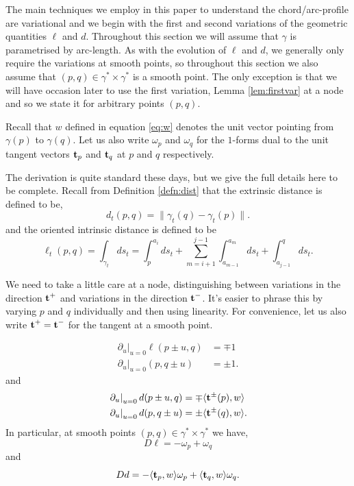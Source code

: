 \documentclass[11pt]{amsart}
\begin{document}
The main techniques we employ in this paper to understand the chord/arc-profile are variational and we begin with the first and second variations of the geometric quantities \(\ell\) and \(d\). Throughout this section we will assume that \(\gamma\) is parametrised by arc-length. As with the evolution of \(\ell\) and \(d\), we generally only require the variations at smooth points, so throughout this section we also assume that \((p,q) \in \gamma^{\ast} \times \gamma^{\ast}\) is a smooth point. The only exception is that we will have occasion later to use the first variation, Lemma \ref{lem:firstvar} at a node and so we state it for arbitrary points \((p,q)\).

Recall that \(w\) defined in equation \eqref{eq:w} denotes the unit vector pointing from \(\gamma(p)\) to \(\gamma(q)\). Let us also write $\omega_p$ and $\omega_q$ for the $1$-forms dual to the unit tangent vectors $\operatorname{\mathbf{t}}_p$ and $\operatorname{\mathbf{t}}_q$ at $p$ and $q$ respectively.

The derivation is quite standard these days, but we give the full details here to be complete. Recall from Definition \ref{defn:dist} that the extrinsic distance is defined to be,
\[
d_t(p, q) = \|\gamma_t(q) - \gamma_t(p)\|.
\]
and the oriented intrinsic distance is defined to be
\[
\ell_t(p, q) = \int_{\gamma_t} ds_t = \int_p^{a_i} ds_t + \sum_{m=i+1}^{j-1} \int_{a_{m-1}}^{a_m} ds_t + \int_{a_{j-1}}^q ds_t.
\]

We need to take a little care at a node, distinguishing between variations in the direction \(\operatorname{\mathbf{t}}^+\) and variations in the direction \(\operatorname{\mathbf{t}}^-\). It's easier to phrase this by varying \(p\) and \(q\) individually and then using linearity. For convenience, let us also write \(\operatorname{\mathbf{t}}^+ = \operatorname{\mathbf{t}}^-\) for the tangent at a smooth point.

\begin{lemma}
\label{lem:firstvar}
\[
\begin{split}
\left.\partial_u\right|_{u=0} \ell (p \pm u, q)  &= \mp 1 \\
\left.\partial_u\right|_{u=0} (p, q \pm u) &= \pm 1.
\end{split}
\]
and
\[
\begin{split}
\left.\partial_u\right|_{u=0} d (p \pm u, q) &= \mp \langle{\operatorname{\mathbf{t}}^{\pm}(p)},{w}\rangle \\
\left.\partial_u\right|_{u=0} d (p, q \pm u) &= \pm \langle{\operatorname{\mathbf{t}}^{\pm}(q)},{w}\rangle.
\end{split}
\]
In particular, at smooth points \((p,q) \in \gamma^{\ast} \times \gamma^{\ast}\) we have,
\[
D\ell = -\omega_p + \omega_q
\]
and
\[
D d = -\langle{\operatorname{\mathbf{t}}_p},{w}\rangle \omega_p + \langle{\operatorname{\mathbf{t}}_q},{w}\rangle \omega_q.
\]
\end{lemma}
\end{document}
